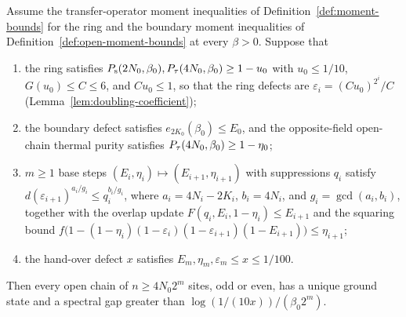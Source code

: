\begin{theorem}
  \label{thm:open-criterion}
  \leanok
  Assume the transfer-operator moment inequalities of Definition~\ref{def:moment-bounds} for the
  ring and the boundary moment inequalities of Definition~\ref{def:open-moment-bounds} at every
  \(\beta > 0\). Suppose that
  \begin{enumerate}
    \item the ring satisfies \(P_{\mathrm{s}}(2N_0, \beta_0), P_{\tau}(4N_0, \beta_0) \ge 1 - u_0\) with
      \(u_0 \le 1/10\), \(G(u_0) \le C \le 6\), and \(Cu_0 \le 1\), so that the ring defects are
      \(\varepsilon_i = (Cu_0)^{2^i}/C\) (Lemma~\ref{lem:doubling-coefficient});
    \item the boundary defect satisfies \(e_{2K_0}(\beta_0) \le E_0\), and the opposite-field
      open-chain thermal purity satisfies \(P_{\tau}(4N_0, \beta_0) \ge 1 - \eta_0\);
    \item \(m \ge 1\) base steps \((E_i, \eta_i) \mapsto (E_{i+1}, \eta_{i+1})\) with suppressions
      \(q_i\) satisfy \(d(\varepsilon_{i+1})^{a_i/g_i} \le q_i^{b_i/g_i}\), where
      \(a_i = 4N_i - 2K_i\), \(b_i = 4N_i\), and \(g_i = \gcd(a_i, b_i)\), together with the
      overlap update \(F(q_i, E_i, 1 - \eta_i) \le E_{i+1}\) and the squaring bound
      \(f\bigl(1 - (1 - \eta_i)(1 - \varepsilon_i)(1 - \varepsilon_{i+1})(1 - E_{i+1})\bigr)
      \le \eta_{i+1}\);
    \item the hand-over defect \(x\) satisfies \(E_m, \eta_m, \varepsilon_m \le x \le 1/100\).
  \end{enumerate}
  Then every open chain of \(n \ge 4N_0 2^m\) sites, odd or even, has a unique ground state and a
  spectral gap greater than \(\log(1/(10x))/(\beta_0 2^m)\).
\end{theorem}
